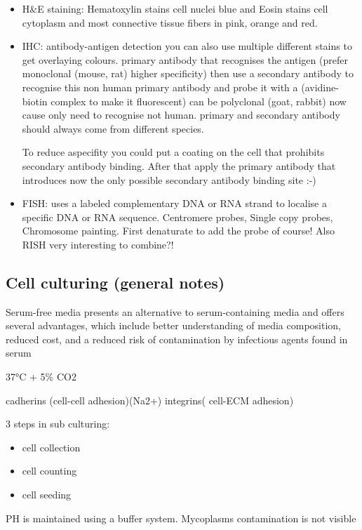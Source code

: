 \documentclass{article}
\begin{document}
\begin{itemize}
    \item H\&E staining:
    Hematoxylin stains cell nuclei blue and Eosin stains cell cytoplasm and most connective tissue fibers in pink, orange and red.

    \item IHC: antibody-antigen detection you can also use multiple different stains to get overlaying colours. primary antibody that recognises the antigen (prefer monoclonal (mouse, rat) higher specificity) then use a secondary antibody to recognise this non human primary antibody and probe it with a (avidine-biotin complex to make it fluorescent) can be polyclonal (goat, rabbit) now cause only need to recognise not human. primary and secondary antibody should always come from different species.

    To reduce aspecifity you could put a coating on the cell that prohibits secondary antibody binding. After that apply the primary antibody that introduces now the only possible secondary antibody binding site :-)

    \item FISH: uses a labeled complementary DNA or RNA strand to localise a specific DNA or RNA sequence. Centromere probes, Single copy probes, Chromosome painting. First denaturate to add the probe of course! Also RISH very interesting to combine?!

\end{itemize}

\subsection{Cell culturing (general notes)}
Serum-free media presents an alternative to serum-containing media and offers several advantages, which include better understanding of media composition, reduced cost, and a reduced risk of contamination by infectious agents found in serum

37°C + 5\% CO2

cadherins (cell-cell adhesion)(Na2+)
integrins( cell-ECM adhesion)

3 steps in sub culturing:
\begin{itemize}
    \item cell collection
    \item cell counting
    \item cell seeding
\end{itemize}
PH is maintained using a buffer system. Mycoplasms contamination is not visible
\end{document}
